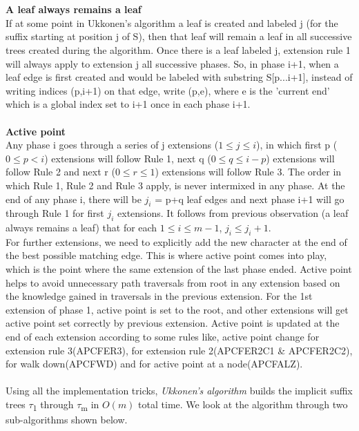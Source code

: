 \documentclass[11pt,a4paper]{article}
\begin{document}
\\
\\
\textbf{A leaf always remains a leaf}
\\
If at some point in Ukkonen's algorithm a leaf is created and labeled j (for the suffix starting at position j of S), then that leaf will remain a leaf in all successive trees created during the algorithm. Once there is a leaf labeled j, extension rule 1 will always apply to extension j all successive phases. So, in phase i+1, when a leaf edge is first created and would be labeled with substring S[p...i+1], instead of writing indices (p,i+1) on that edge, write (p,e), where e is the 'current end' which is a global index set to i+1 once in each phase i+1.
\\
\\
\textbf{Active point}
\\
Any phase i goes through a series of j extensions ($1 \leq j \leq i$), in which first p ($0 \leq p < i$) extensions will follow Rule 1, next q ($0 \leq q \leq i-p$) extensions will follow Rule 2 and next r ($0 \leq r \leq 1$) extensions will follow Rule 3. The order in which Rule 1, Rule 2 and Rule 3 apply, is never intermixed in any phase. At the end of any phase i, there will be $j_i$ = p+q leaf edges and next phase i+1 will go through Rule 1 for first $j_i$ extensions. It follows from previous observation (a leaf always remains a leaf) that for each $1 \leq i \leq m-1$, $j_i \leq j_i+1$.
\\
For further extensions, we need to explicitly add the new character at the end of the best possible matching edge. This is where active point comes into play, which is the point where the same extension of the last phase ended. Active point helps to avoid unnecessary path traversals from root in any extension based on the knowledge gained in traversals in the previous extension. For the 1st extension of phase 1, active point is set to the root, and other extensions will get active point set correctly by previous extension. Active point is updated at the end of each extension according to some rules like, active point change for extension rule 3(APCFER3), for extension rule 2(APCFER2C1 \& APCFER2C2), for walk down(APCFWD) and for active point at a node(APCFALZ).
\\
\\
Using all the implementation tricks, \emph{Ukkonen's algorithm} builds the implicit suffix trees \begin{math}\tau\end{math}\textsubscript{1} through \begin{math}\tau\end{math}\textsubscript{m} in \begin{math}O(m)\end{math} total time. We look at the algorithm through two sub-algorithms shown below.
\end{document}
